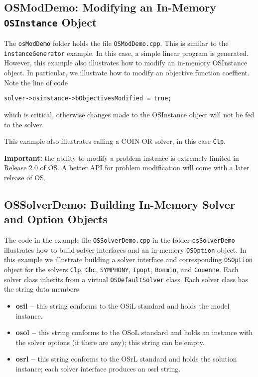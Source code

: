 \documentclass[11pt]{article}
\renewcommand{\_}{{\char"5F}}
\renewcommand{\{}{{\char"7B}}
\renewcommand{\}}{{\char"7D}}
\renewcommand{\^}{{\char"0D}}
\renewcommand{\'}{{\char"0D}}
\begin{document}
\subsection{OSModDemo: Modifying an In-Memory {\tt OSInstance} Object}\label{section:exampleOSModDemo}

The {\tt osModDemo} folder holds the file {\tt OSModDemo.cpp}. This is similar to the {\tt instanceGenerator} example.
In this case, a simple linear program is generated. However, this example also illustrates how to modify an in-memory OSInstance object. In particular, we illustrate how to modify an objective function coeffient. Note the line of code 

\begin{verbatim}
solver->osinstance->bObjectivesModified = true;
\end{verbatim}
which is critical, otherwise changes made to the OSInstance object will not be fed to the solver. 

This example also illustrates calling a COIN-OR solver,
in this case {\tt Clp}.

\vskip 8pt

{\bf Important:} the ability to modify a problem instance is extremely limited in Release 2.0 of OS. A better API for problem modification will come with a later release of OS.



\subsection{OSSolverDemo: Building In-Memory Solver and Option Objects}\label{section:exampleOSSolverDemo}

The code in the  example file {\tt OSSolverDemo.cpp} in the folder {\tt osSolverDemo}  illustrates  how to build solver interfaces and  an in-memory {\tt OSOption} object. In this example we  illustrate building a solver interface and corresponding {\tt OSOption} object for the solvers {\tt Clp}, {\tt Cbc}, {\tt SYMPHONY}, {\tt Ipopt},   {\tt Bonmin}, and {\tt Couenne}.   Each solver class inherits from a virtual {\tt OSDefaultSolver} class. Each solver class has the string data members

\begin{itemize}
\item {\bf osil --} this string conforms to the OSiL standard and holds the model instance.

\item {\bf osol --} this string conforms to the OSoL standard and holds an instance with the 
solver options (if there are any); this string can be empty.

\item {\bf osrl --} this string conforms to the OSrL standard and holds the solution instance; 
each solver interface produces an osrl string.
\end{itemize}
\end{document}
